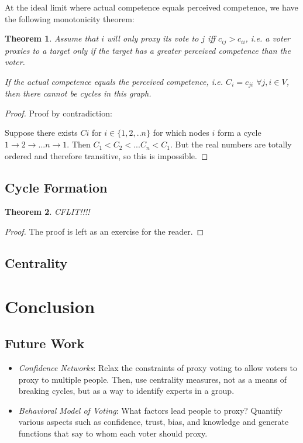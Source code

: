 \documentclass[10pt]{article}
\newtheorem{theorem}{Theorem}[section]
\begin{document}
At the ideal limit where actual competence equals perceived competence, we have the following monotonicity theorem:

\begin{theorem}

Assume that $i$ will only proxy its vote to $j$ iff $c_{ij} > c_{ii}$, i.e. a voter proxies to a target only if the target has a greater perceived competence than the voter.

If the actual competence equals the perceived competence, i.e. $C_i = c_{ji}$ $\forall j, i \in V$, then there cannot be cycles in this graph.

\end{theorem}

\begin{proof}

Proof by contradiction:

Suppose there exists $Ci$ for $i \in \{1, 2, .. n\}$ for which nodes $i$ form a cycle $1 \rightarrow 2 \rightarrow ... n \rightarrow 1$. Then $C_1 < C_2 < ... C_n < C_1$. But the real numbers are totally ordered and therefore transitive, so this is impossible.

\end{proof}

\subsection{Cycle Formation}

\begin{theorem}
CFLIT!!!!
\end{theorem}
\begin{proof}
The proof is left as an exercise for the reader.
\end{proof}

\subsection{Centrality}
\section{Conclusion}

\subsection{Future Work}
\begin{itemize}
\item \textit{Confidence Networks}: Relax the constraints of proxy voting to allow voters to proxy to multiple people. Then, use centrality measures, not as a means of breaking cycles, but as a way to identify experts in a group.

\item \textit{Behavioral Model of Voting}: What factors lead people to proxy? Quantify various aspects such as confidence, trust, bias, and knowledge and generate functions that say to whom each voter should proxy.
\end{itemize}
\end{document}

